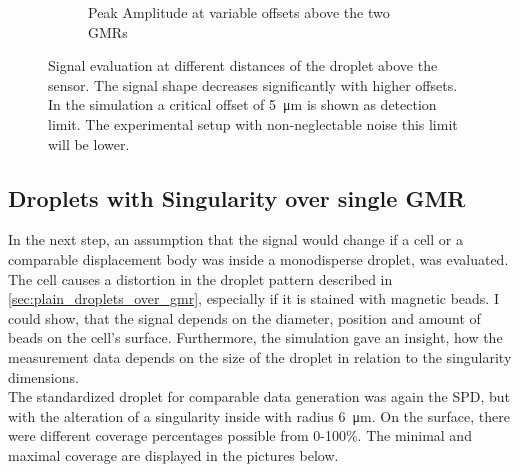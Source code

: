 \begin{figure}[htb!]
\begin{subfigure}[r]{0.49\linewidth}
	\caption{Peak Amplitude at variable offsets above the two GMRs}
	\label{fig:sim:off:z:shape}
\end{subfigure}
	\caption{Signal evaluation at different distances of the droplet above the sensor. The signal shape decreases significantly with higher offsets. In the simulation a critical offset of \SI{5}{\micro\meter} is shown as detection limit. The experimental setup with non-neglectable noise this limit will be lower.}
	\label{fig:sim:off:z}
\end{figure}

\newpage
\subsection{Droplets with Singularity over single GMR}
In the next step, an assumption that the signal would change if a cell or a comparable displacement body was inside a monodisperse droplet, was evaluated. The cell causes a distortion in the droplet pattern described in \ref{sec:plain_droplets_over_gmr}, especially if it is stained with magnetic beads. I could show, that the signal depends on the diameter, position and amount of beads on the cell's surface. Furthermore, the simulation gave an insight, how the measurement data depends on the size of the droplet in relation to the singularity dimensions. \\
The standardized droplet for comparable data generation was again the SPD, but with the alteration of a singularity inside with radius \SI{6}{\micro\meter}. On the surface, there were different coverage percentages possible from 0-100\%. The minimal and maximal coverage are displayed in the pictures below.
